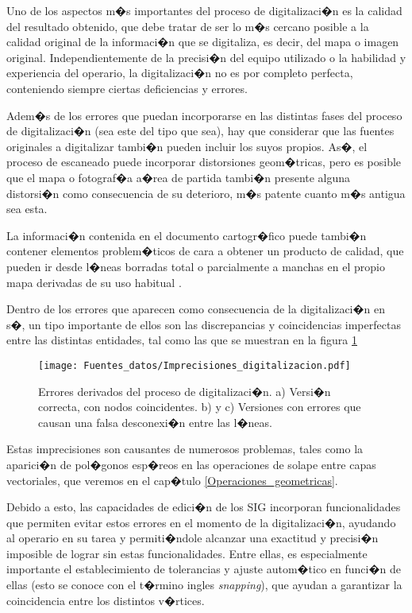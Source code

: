 
Uno de los aspectos m�s importantes del proceso de digitalizaci�n es la calidad del resultado obtenido, que debe tratar de ser lo m�s cercano posible a la calidad original de la informaci�n que se digitaliza, es decir, del mapa o imagen original. Independientemente de la precisi�n del equipo utilizado o la habilidad y experiencia del operario, la digitalizaci�n no es por completo perfecta, conteniendo siempre ciertas deficiencias y errores. 

Adem�s de los errores que puedan incorporarse en las distintas fases del proceso de digitalizaci�n (sea este del tipo que sea), hay que considerar que las fuentes originales a digitalizar tambi�n pueden incluir los suyos propios. As�, el proceso de escaneado puede incorporar distorsiones geom�tricas, pero es posible que el mapa o fotograf�a a�rea de partida tambi�n presente alguna distorsi�n como consecuencia de su deterioro, m�s patente cuanto m�s antigua sea esta. 

La informaci�n contenida en el documento cartogr�fico puede tambi�n contener elementos problem�ticos de cara a obtener un producto de calidad, que pueden ir desde l�neas borradas total o parcialmente a manchas en el propio mapa derivadas de su uso habitual \cite{Heywood1998Longman}.

Dentro de los errores que aparecen como consecuencia de la digitalizaci�n en s�, un tipo importante de ellos son las discrepancias y coincidencias imperfectas entre las distintas entidades, tal como las que se muestran en la figura \ref{Fig:Imprecisiones_digitalizacion}

\begin{figure}[!hbt]   
\centering
\texttt{[image: Fuentes\_datos/Imprecisiones\_digitalizacion.pdf]}
\caption{\small Errores derivados del proceso de digitalizaci�n. a) Versi�n correcta, con nodos coincidentes. b) y c) Versiones con errores que causan una falsa desconexi�n entre las l�neas.}
\label{Fig:Imprecisiones_digitalizacion} 
\end{figure}

Estas imprecisiones son causantes de numerosos problemas, tales como la aparici�n de pol�gonos esp�reos en las operaciones de solape entre capas vectoriales, que veremos en el cap�tulo \ref{Operaciones_geometricas}.

Debido a esto, las capacidades de edici�n de los SIG incorporan funcionalidades que permiten evitar estos errores en el momento de la digitalizaci�n, ayudando al operario en su tarea y permiti�ndole alcanzar una exactitud y precisi�n imposible de lograr sin estas funcionalidades. Entre ellas, es especialmente importante el establecimiento de tolerancias y ajuste autom�tico en funci�n de ellas (esto se conoce con el t�rmino ingles \emph{snapping}), que ayudan a garantizar la coincidencia entre los distintos v�rtices. 

